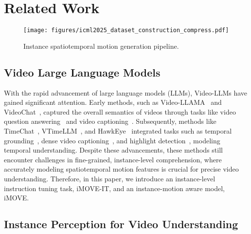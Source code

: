 \section{Related Work}
\begin{figure*}
    \centering
    \texttt{[image: figures/icml2025\_dataset\_construction\_compress.pdf]}
    \caption{Instance spatiotemporal motion generation pipeline.}
    \label{fig:motion_anno}
    \vspace{-0.5cm}
\end{figure*}
\subsection{Video Large Language Models}
With the rapid advancement of large language models (LLMs), Video-LLMs have gained significant attention. Early methods, such as Video-LLAMA~\citep{video-llama} and VideoChat~\citep{videochat}, captured the overall semantics of videos through tasks like video question answering~\citep{video-chatgpt, zhang2024llava-video} and video captioning~\citep{sharegpt4video, zhang2024llava-video}. Subsequently, methods like TimeChat~\citep{timechat}, VTimeLLM~\citep{vtimellm}, and HawkEye~\citep{hawkeye} integrated tasks such as temporal grounding~\citep{charades-sta}, dense video captioning~\citep{activitynet}, and highlight detection~\citep{qvhighlights}, modeling temporal understanding. Despite these advancements, these methods still encounter challenges in fine-grained, instance-level comprehension, where accurately modeling spatiotemporal motion features is crucial for precise video understanding. Therefore, in this paper, we introduce an instance-level instruction tuning task, iMOVE-IT, and an instance-motion aware model, iMOVE.


\subsection{Instance Perception for Video Understanding}


